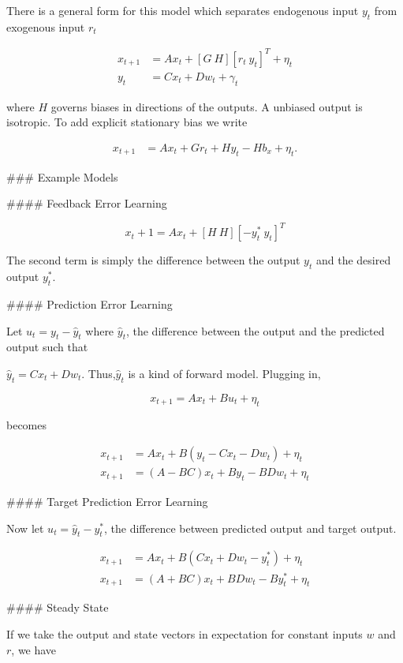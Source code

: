 \documentclass[../main.tex]{subfiles}
\begin{document}
{{{There is a general form for this model which separates endogenous input $y_t$ from exogenous input $r_t$

$$
\begin{aligned}
x_{t+1} &= Ax_t + [G \ H][r_t \ y_t]^T + \eta_t \\
y_t &= Cx_t + Dw_t + \gamma_t
\end{aligned}
$$

where $H$ governs biases in directions of the outputs. A unbiased output is isotropic. To add
explicit stationary bias we write

$$
\begin{aligned}
x_{t+1} &= Ax_t + Gr_t + Hy_t - Hb_x + \eta_t.
\end{aligned}
$$

### Example Models

#### Feedback Error Learning

$$x_t+1 = Ax_t + [H\ H][-y_t^*\ y_t]^T$$

The second term is simply the difference between the output $y_t$ and the desired output $y_t^*$.

#### Prediction Error Learning

Let $u_t = y_t - \hat{y}_t$ where $\hat{y}_t$, the difference between the output and the predicted output such that

$\hat{y}_t = Cx_t + Dw_t$. Thus,$\hat{y}_t$ is a kind of forward model. Plugging in,

$$x_{t+1} = Ax_t + Bu_t + \eta_t$$

becomes

$$
\begin{aligned}
x_{t+1} &= Ax_t + B(y_t - Cx_t - Dw_t) + \eta_t \\
x_{t+1} &= (A-BC)x_t + By_t - BDw_t + \eta_t
\end{aligned}
$$

#### Target Prediction Error Learning

Now let $u_t = \hat{y}_t - y^*_t$, the difference between predicted
output and target output.

$$
\begin{aligned}
x_{t+1} &= Ax_t + B(Cx_t + Dw_t - y^*_t) + \eta_t \\
x_{t+1} &= (A+BC)x_t + BDw_t - By^*_t + \eta_t
\end{aligned}
$$

#### Steady State

If we take the output and state vectors in expectation for constant
inputs $w$ and $r$, we have

}}}
\end{document}

